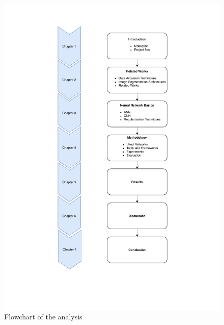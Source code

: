 \begin{figure}
    \centerline{\includegraphics[width=1\columnwidth]{01-introduction/figures/project-flow.pdf}}
    \caption{ Flowchart of the analysis }
    \label{figure:project-flow}
\end{figure}
